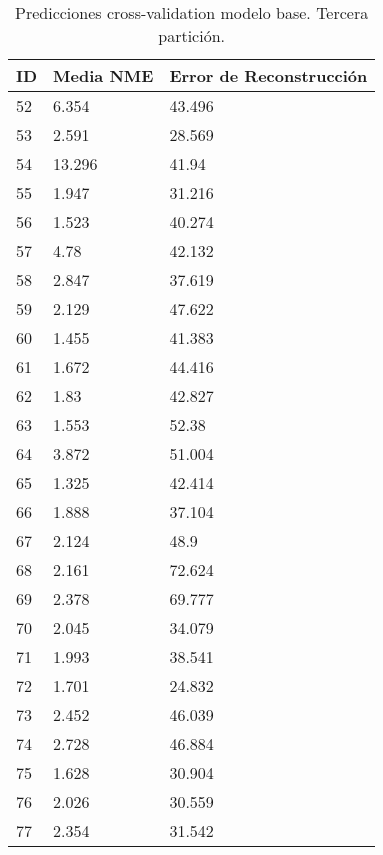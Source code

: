 \begin{table}[!ht]
    \centering
    \caption{Predicciones cross-validation modelo base. Tercera partición.}
    \begin{tabular}{|l|l|l|}
    \hline
        \cellcolor{gray!25}\textbf{ID} & \cellcolor{gray!25}\textbf{Media NME} & \cellcolor{gray!25}\textbf{Error de Reconstrucción} \\ \hline
        52 & 6.354 & 43.496 \\ \hline
        53 & 2.591 & 28.569 \\ \hline
        54 & 13.296 & 41.94 \\ \hline
        55 & 1.947 & 31.216 \\ \hline
        56 & 1.523 & 40.274 \\ \hline
        57 & 4.78 & 42.132 \\ \hline
        58 & 2.847 & 37.619 \\ \hline
        59 & 2.129 & 47.622 \\ \hline
        60 & 1.455 & 41.383 \\ \hline
        61 & 1.672 & 44.416 \\ \hline
        62 & 1.83 & 42.827 \\ \hline
        63 & 1.553 & 52.38 \\ \hline
        64 & 3.872 & 51.004 \\ \hline
        65 & 1.325 & 42.414 \\ \hline
        66 & 1.888 & 37.104 \\ \hline
        67 & 2.124 & 48.9 \\ \hline
        68 & 2.161 & 72.624 \\ \hline
        69 & 2.378 & 69.777 \\ \hline
        70 & 2.045 & 34.079 \\ \hline
        71 & 1.993 & 38.541 \\ \hline
        72 & 1.701 & 24.832 \\ \hline
        73 & 2.452 & 46.039 \\ \hline
        74 & 2.728 & 46.884 \\ \hline
        75 & 1.628 & 30.904 \\ \hline
        76 & 2.026 & 30.559 \\ \hline
        77 & 2.354 & 31.542 \\ \hline
    \end{tabular}
\end{table}

